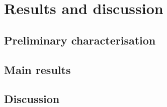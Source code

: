 %
%
%
%
\chapter{Results and discussion}
\label{ch:results}

\section{Preliminary characterisation}
\label{sec:results-preliminary}

\section{Main results}
\label{sec:results-main}
%

\section{Discussion}
\label{sec:discussion}

